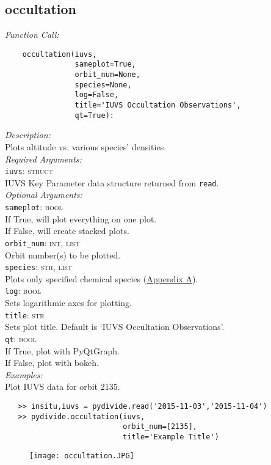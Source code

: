 \documentclass{article}
\begin{document}
\subsection{occultation}
\label{subsec:occultation}
\vspace{-5mm}
\textit{Function Call:}\\
\vspace{-10mm}
\begin{verbatim}
    occultation(iuvs,
                sameplot=True,
                orbit_num=None,
                species=None,
                log=False,
                title='IUVS Occultation Observations',
                qt=True):
\end{verbatim}
\vspace{-5mm}
\noindent
\textit{Description:}\\
\indent Plots altitude vs. various species' densities.\\
\textit{Required Arguments:}\\
\indent \texttt{iuvs}: \textsc{struct}\\
\indent \indent IUVS Key Parameter data structure returned from \texttt{read}.\\
\textit{Optional Arguments:}\\
\indent \texttt{sameplot}: \textsc{bool}\\
\indent \indent If True, will plot everything on one plot.\\
\indent \indent If False, will create stacked plots.\\
\indent \texttt{orbit\_num}: \textsc{int, list}\\
\indent \indent Orbit number(s) to be plotted.\\
\indent \texttt{species}: \textsc{str, list}\\
\indent \indent Plots only specified chemical species (\hyperref[sec:chemicalspecies]{Appendix A}).\\
\indent \texttt{log}: \textsc{bool}\\
\indent \indent Sets logarithmic axes for plotting.\\
\indent \texttt{title}: \textsc{str}\\
\indent \indent Sets plot title. Default is `IUVS Occultation Observations'.\\
\indent \texttt{qt}: \textsc{bool}\\
\indent \indent If True, plot with PyQtGraph.\\
\indent \indent If False, plot with bokeh.\\
\noindent \textit{Examples:}\\
\indent Plot IUVS data for orbit 2135.\\
\vspace{-10mm}
\begin{verbatim}
   >> insitu,iuvs = pydivide.read('2015-11-03','2015-11-04')
   >> pydivide.occultation(iuvs,
                           orbit_num=[2135],
                           title='Example Title')
\end{verbatim}
\begin{figure}[H]
\centering
\texttt{[image: occultation.JPG]}
\end{figure}
\end{document}
